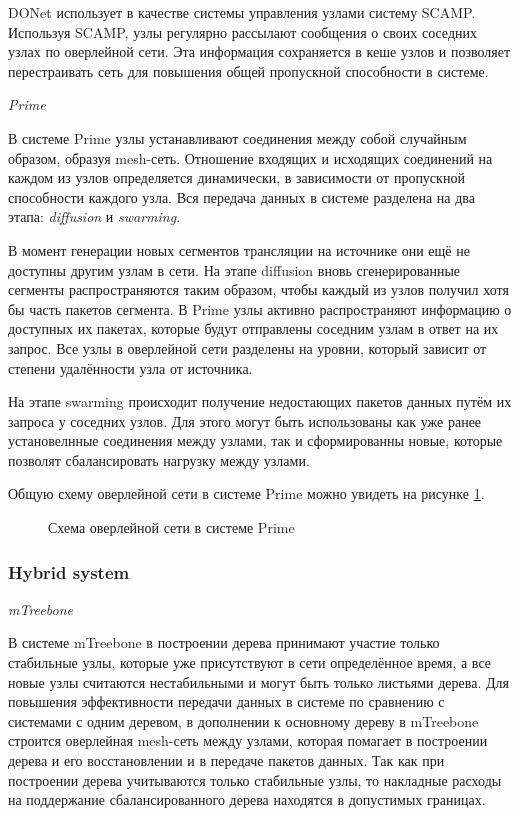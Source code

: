 		DONet использует в качестве системы управления узлами систему SCAMP. Используя SCAMP, узлы регулярно рассылают
		сообщения о своих соседних узлах по оверлейной сети. Эта информация сохраняется в кеше узлов и позволяет
		перестраивать сеть для повышения общей пропускной способности в системе.

		\textit{Prime}

		В системе Prime узлы устанавливают соединения между собой случайным образом, образуя mesh-сеть. Отношение
		входящих и исходящих соединений на каждом из узлов определяется динамически, в зависимости от пропускной
		способности каждого узла. Вся передача данных в системе разделена на два этапа: \textit{diffusion} и
		\textit{swarming}.

		В момент генерации новых сегментов трансляции на источнике они ещё не доступны другим узлам в сети. На этапе
		diffusion вновь сгенерированные сегменты распространяются таким образом, чтобы каждый из узлов получил хотя бы
		часть пакетов сегмента. В Prime узлы активно распространяют информацию о доступных их пакетах, которые будут
		отправлены соседним узлам в ответ на их запрос. Все узлы в оверлейной сети разделены на уровни, который зависит
		от степени удалённости узла от источника.

		На этапе swarming происходит получение недостающих пакетов данных путём их запроса у соседних узлов. Для этого
		могут быть использованы как уже ранее установелнные соединения между узлами, так и сформированны новые, которые
		позволят сбалансировать нагрузку между узлами.

		Общую схему оверлейной сети в системе Prime можно увидеть на рисунке \ref{img:prime-overlay}.

		\begin{figure}[h]
			\caption{Схема оверлейной сети в системе Prime}
			\label{img:prime-overlay}
		\end{figure}

		\subsubsection{Hybrid system}

		\textit{mTreebone}

		В системе mTreebone в построении дерева принимают участие только стабильные узлы, которые уже присутствуют в
		сети определённое время, а все новые узлы считаются нестабильными и могут быть только листьями дерева. Для
		повышения эффективности передачи данных в системе по сравнению с системами с одним деревом, в дополнении к
		основному дереву в mTreebone строится оверлейная mesh-сеть между узлами, которая помагает в построении дерева и
		его восстановлении и в передаче пакетов данных. Так как при построении дерева учитываются только стабильные узлы,
		то накладные расходы на поддержание сбалансированного дерева находятся в допустимых границах.

